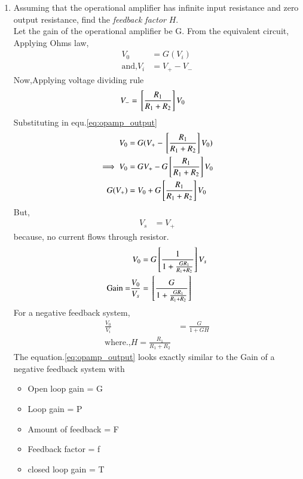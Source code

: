 \begin{enumerate}[label=\thesubsection.\arabic*.,ref=\thesubsection.\theenumi]
\item Assuming that the operational amplifier has infinite input resistance and zero output resistance, find  the {\em feedback factor} $H$.
\\
\solution Let the gain of the operational amplifier be G.
From the equivalent circuit,
Applying Ohms law,
\begin{align}
V_0 &= G(V_i) \label{eq:opamp_output}\\
\text{and,} V_i &= V_+-V_-
\end{align}
Now,Applying voltage dividing rule
\begin{align}
V_- &= {}\left[\frac{R_1}{R_1+R_2}\right]V_0
\end{align}
Substituting in equ.\ref{eq:opamp_output}
\begin{align}
    V_0 &= G(V_+-{}\left[\frac{R_1}{R_1+R_2}\right]V_0)
    \\
\implies V_0 &= GV_+-G{}\left[\frac{R_1}{R_1+R_2}\right]V_0
    \\
G(V_+)&=V_0+G{}\left[\frac{R_1}{R_1+R_2}\right]V_0
\end{align}
But,
\begin{align}
    V_s &= V_+
\end{align}
because, no current flows through resistor.  
\begin{align}
    V_0 &= G{}\left[\frac{1}{1+\frac{GR_1}{R_1+R_2}}\right]V_s
    \\
 \text{Gain =}\frac{V_0}{V_s}&={}\left[\frac{G}{1+\frac{GR_1}{R_1+R_2}}\right]\label{eq:opamp_gain}
\end{align}
For a negative feedback system,
\begin{align}
   \frac{V_0}{V_i} &= \frac{G}{1+GH}
  \\
  \text{where.,} H = \frac{R_1}{R_1+R_2}
\end{align}
The equation.\ref{eq:opamp_output} looks exactly similar to the Gain of a negative feedback system with
\begin{itemize}
    \item Open loop gain = G
    \item Loop gain = P 
    \item Amount of feedback = F
    \item Feedback factor = f
    \item closed loop gain = T
\end{itemize}
\begin{table}[!ht]
\centering

\caption{}
\label{table:ee18btech11005_Output_Table}
\end{table}

\end{enumerate}
